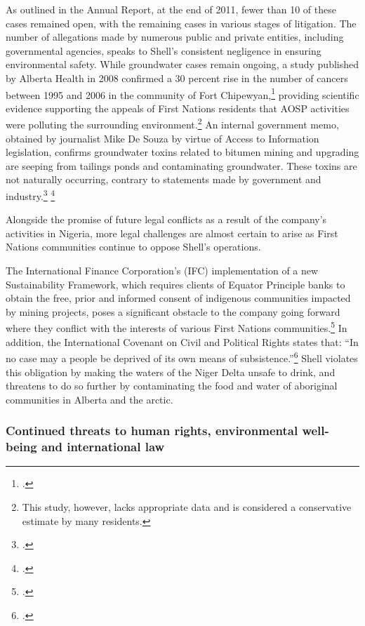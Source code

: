 \begin{description}
As outlined in the Annual Report, at the end of 2011, fewer than 10 of these cases remained open, with the remaining cases in various stages of litigation. The number of allegations made by numerous public and private entities, including governmental agencies, speaks to Shell's consistent negligence in ensuring environmental safety. While groundwater cases remain ongoing, a study published by Alberta Health in 2008 confirmed a 30 percent rise in the number of cancers between 1995 and 2006 in the community of Fort Chipewyan,\footcite[][]{RiskingRuin_2012} providing scientific evidence supporting the appeals of First Nations residents that AOSP activities were polluting the surrounding environment.\footnote{This study, however, lacks appropriate data and is considered a conservative estimate by many residents.} An internal government memo, obtained by journalist Mike De Souza by virtue of Access to Information legislation, confirms groundwater toxins related to bitumen mining and upgrading are seeping from tailings ponds and contaminating groundwater. These toxins are not naturally occurring, contrary to statements made by government and industry.\footcite[][]{Memorandum_2012} \footcite[See also: ][]{TailingsLeaking}
\end{description}


Alongside the promise of future legal conflicts as a result of the company's activities in Nigeria, more legal challenges are almost certain to arise as First Nations communities continue to oppose Shell's operations. 



The International Finance Corporation's (IFC) implementation of a new Sustainability Framework, which requires clients of Equator Principle banks to obtain the free, prior and informed consent of indigenous communities impacted by mining projects, poses a significant obstacle to the company going forward where they conflict with the interests of various First Nations communities.\footcite[][]{Sosa_2011}
In addition, the International Covenant on Civil and Political Rights states that: ``In no case may a people be deprived of its own means of subsistence.''\footcite[Part I, Article I (2)][]{CivilAndPolitical}
Shell violates this obligation by making the waters of the Niger Delta unsafe to drink, and threatens to do so further by contaminating the food and water of aboriginal communities in Alberta and the arctic.



	\subsubsection{Continued threats to human rights, environmental well-being and international law}
	

